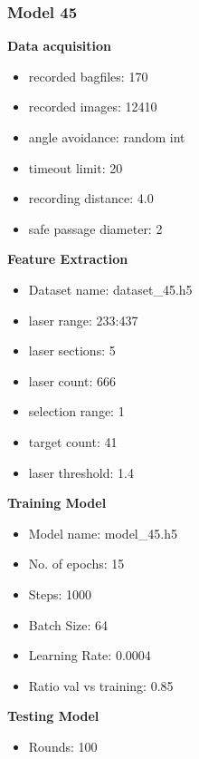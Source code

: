 \subsubsection{Model 45\label{model_45} }
\begin{multicols}{2}\textbf{Data acquisition}
\begin{itemize}
\setlength\itemsep{0.1em}
\item recorded bagfiles: 170
\item recorded images: 12410
\item angle avoidance: random int
\item timeout limit: 20
\item recording distance: 4.0
\item safe passage diameter: 2
\end{itemize}
\textbf{Feature Extraction}
\begin{itemize}
\setlength\itemsep{0.1em}
\item Dataset name: dataset\_45.h5
\item  laser range: 233:437
\item  laser sections: 5
\item  laser count: 666
\item  selection range: 1
\item  target count: 41
\item  laser threshold: 1.4
\end{itemize}
\columnbreak\textbf{Training Model}
\begin{itemize}
\setlength\itemsep{0.1em}
\item  Model name: model\_45.h5
\item  No. of epochs: 15
\item  Steps: 1000
\item  Batch Size: 64
\item  Learning Rate: 0.0004
\item  Ratio val vs training: 0.85
\end{itemize}
\textbf{Testing Model}
\begin{itemize}
\setlength\itemsep{0.1em}
\item Rounds: 100
\newline
\newline
\newline
\newline
\newline
\newline
\newline
\newline

\end{itemize}
\end{multicols}
